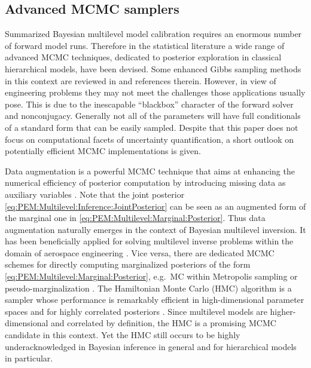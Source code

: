 \subsection{Advanced MCMC samplers} \label{sec:PEM:Computations:AdvancedSamplers}
Summarized Bayesian multilevel model calibration requires an enormous number of forward model runs.
Therefore in the statistical literature a wide range of advanced MCMC techniques, dedicated to posterior exploration in classical hierarchical models, have been devised.
Some enhanced Gibbs sampling methods in this context are reviewed in \cite{MCMC:Gilks1996} and references therein.
However, in view of engineering problems they may not meet the challenges those applications usually pose.
This is due to the inescapable ``blackbox'' character of the forward solver and nonconjugacy.
Generally not all of the parameters will have full conditionals of a standard form that can be easily sampled.
Despite that this paper does not focus on computational facets of uncertainty quantification, a short outlook on potentially efficient MCMC implementations is given.
\par %
Data augmentation is a powerful MCMC technique that aims at enhancing the numerical efficiency of posterior computation by introducing missing data as auxiliary variables \cite{MCMC:Dyk2001,MCMC:Dyk2003}.
Note that the joint posterior \cref{eq:PEM:Multilevel:Inference:JointPosterior} can be seen as an augmented form of the marginal one in \cref{eq:PEM:Multilevel:Marginal:Posterior}.
Thus data augmentation naturally emerges in the context of Bayesian multilevel inversion.
It has been beneficially applied for solving multilevel inverse problems within the domain of aerospace engineering \cite{Nagel:SciTech2014:Proc,Nagel:JAIS2015}.
Vice versa, there are dedicated MCMC schemes for directly computing marginalized posteriors of the form \cref{eq:PEM:Multilevel:Marginal:Posterior},
e.g.\ MC within Metropolis sampling \cite{MCMC:ONeill2000,MCMC:Beaumont2003} or pseudo-marginalization \cite{MCMC:Andrieu2009}.
The Hamiltonian Monte Carlo (HMC) algorithm is a sampler whose performance is remarkably efficient in high-dimensional parameter spaces and for highly correlated posteriors \cite{MCMC:Duane1987,MCMC:Neal2011}.
Since multilevel models are higher-dimensional and correlated by definition, the HMC is a promising MCMC candidate in this context.
Yet the HMC still occurs to be highly underacknowledged in Bayesian inference in general and for hierarchical models in particular.